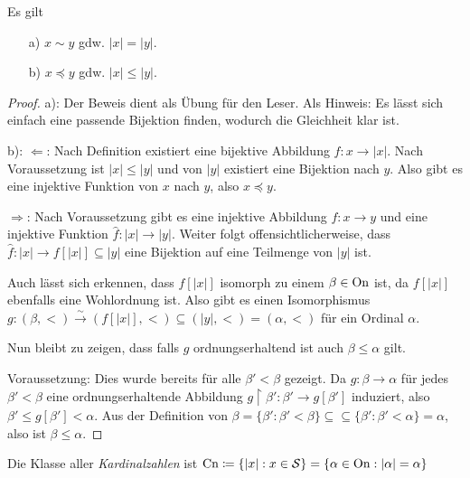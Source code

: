 \begin{lemma}
	Es gilt
	\begin{itemize}
		\item[a)] $x\sim y$ gdw. $\vert x \vert = \vert y \vert$.
		\item[b)] $x\preceq y$ gdw. $\vert x \vert \leq \vert y \vert$.
	\end{itemize}
\end{lemma}
\begin{proof}
	a): Der Beweis dient als Übung für den Leser. Als Hinweis: Es lässt sich einfach eine passende Bijektion finden, wodurch die Gleichheit klar ist.
	\par
	b): $\Leftarrow$: Nach Definition existiert eine bijektive Abbildung $f:x\to\vert x \vert$. Nach Voraussetzung ist $\vert x \vert \leq \vert y \vert$ und von $\vert y \vert$ existiert eine Bijektion nach $y$. Also gibt es eine injektive Funktion von $x$ nach $y$, also $x\preceq y$.
	\par
	$\Rightarrow$: Nach Voraussetzung gibt es eine injektive Abbildung $f:x\to y$ und eine injektive Funktion $\hat f:\vert x \vert \to \vert  y \vert$. Weiter folgt offensichtlicherweise, dass $\hat f : \vert x \vert \to f[\vert x \vert]\subseteq \vert y \vert$ eine Bijektion auf eine Teilmenge von $\vert y \vert$ ist.
	
	Auch lässt sich erkennen, dass $f[\vert x \vert]$ isomorph zu einem $\beta\in \operatorname{On}$ ist, da $f[\vert x\vert]$ ebenfalls eine Wohlordnung ist. Also gibt es einen Isomorphismus $g:(\beta, <)\xrightarrow{\sim}(f[\vert x \vert], <)\subseteq (\vert y \vert, <)=(\alpha, <)$ für ein Ordinal $\alpha$.
	
	Nun bleibt zu zeigen, dass falls $g$ ordnungserhaltend ist auch $\beta \leq \alpha$ gilt.
	
	Voraussetzung: Dies wurde bereits für alle $\beta'<\beta$ gezeigt. Da $g:\beta\to\alpha$ für jedes $\beta'<\beta$ eine ordnungserhaltende Abbildung $g\upharpoonright\beta':\beta'\to g[\beta']$ induziert, also $\beta'\leq g[\beta']< \alpha$. Aus der Definition von $\beta=\{\beta':\beta'<\beta\}\subseteq \subseteq\{\beta':\beta'<\alpha\}=\alpha$, also ist $\beta\leq\alpha$.
\end{proof}

\begin{definition}[Kardinalzahlen]
	Die Klasse aller \textit{Kardinalzahlen} ist $\operatorname{Cn}\coloneqq\{\vert x \vert : x\in \mathcal{S}\}=\{\alpha\in \operatorname{On} : \vert\alpha\vert=\alpha\}$
\end{definition}

